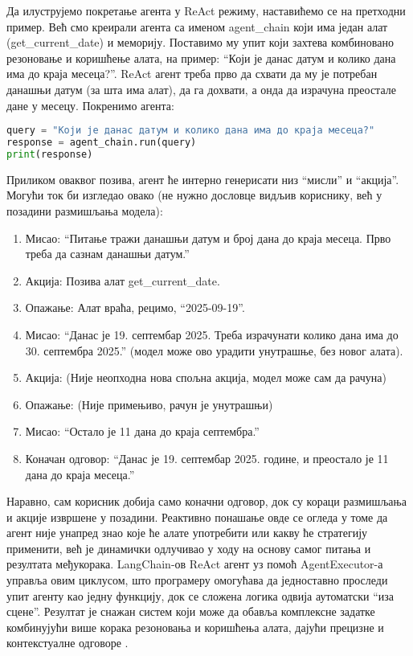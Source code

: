 Да илуструјемо покретање агента у ReAct режиму, наставићемо се на претходни пример. Већ смо креирали агента са именом agent\_chain који има један алат (get\_current\_date) и меморију. Поставимо му упит који захтева комбиновано резоновање и коришћење алата, на пример: ``Који је данас датум и колико дана има до краја месеца?''. ReAct агент треба прво да схвати да му је потребан данашњи датум (за шта има алат), да га дохвати, а онда да израчуна преостале дане у месецу. Покренимо агента:

\begin{lstlisting}[language=Python, caption={Покретање ReAct агента}]
query = "Који је данас датум и колико дана има до краја месеца?"
response = agent_chain.run(query)
print(response)
\end{lstlisting}

Приликом оваквог позива, агент ће интерно генерисати низ ``мисли'' и ``акција''. Могући ток би изгледао овако (не нужно дословце видљив кориснику, већ у позадини размишљања модела):
\begin{enumerate}
    \item Мисао: ``Питање тражи данашњи датум и број дана до краја месеца. Прво треба да сазнам данашњи датум.''
    \item Акција: Позива алат get\_current\_date.
    \item Опажање: Алат враћа, рецимо, ``2025-09-19''.
    \item Мисао: ``Данас је 19. септембар 2025. Треба израчунати колико дана има до 30. септембра 2025.'' (модел може ово урадити унутрашње, без новог алата).
    \item Акција: (Није неопходна нова спољна акција, модел може сам да рачуна)
    \item Опажање: (Није примењиво, рачун је унутрашњи)
    \item Мисао: ``Остало је 11 дана до краја септембра.''
    \item Коначан одговор: ``Данас је 19. септембар 2025. године, и преостало је 11 дана до краја месеца.''
\end{enumerate}

Наравно, сам корисник добија само коначни одговор, док су кораци размишљања и акције извршене у позадини. Реактивно понашање овде се огледа у томе да агент није унапред знао које ће алате употребити или какву ће стратегију применити, већ је динамички одлучивао у ходу на основу самог питања и резултата међукорака. LangChain-ов ReAct агент уз помоћ AgentExecutor-а управља овим циклусом, што програмеру омогућава да једноставно проследи упит агенту као једну функцију, док се сложена логика одвија аутоматски ``иза сцене''. Резултат је снажан систем који може да обавља комплексне задатке комбинујући више корака резоновања и коришћења алата, дајући прецизне и контекстуалне одговоре \cite{langchain_docs_2024}.



